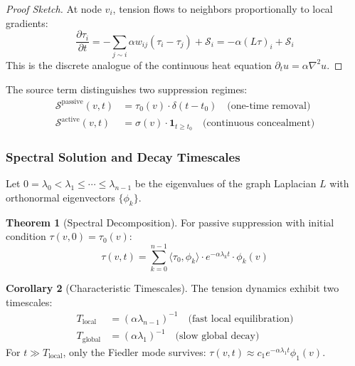 \documentclass[11pt,a4paper]{article}
\theoremstyle{definition}
\newtheorem{theorem}{Theorem}[section]
\newtheorem{corollary}[theorem]{Corollary}
\theoremstyle{remark}
\begin{document}
\begin{proof}[Proof Sketch]
At node $v_i$, tension flows to neighbors proportionally to local gradients:
\begin{equation}
    \frac{\partial \tau_i}{\partial t} = -\sum_{j \sim i} \alpha w_{ij}(\tau_i - \tau_j) + \mathcal{S}_i = -\alpha (L\tau)_i + \mathcal{S}_i
\end{equation}
This is the discrete analogue of the continuous heat equation $\partial_t u = \alpha \nabla^2 u$.
\end{proof}

The source term distinguishes two suppression regimes:
\begin{align}
    \mathcal{S}^{\text{passive}}(v, t) &= \tau_0(v) \cdot \delta(t - t_0) \quad \text{(one-time removal)} \\
    \mathcal{S}^{\text{active}}(v, t) &= \sigma(v) \cdot \mathbf{1}_{t \geq t_0} \quad \text{(continuous concealment)}
\end{align}

\subsubsection{Spectral Solution and Decay Timescales}

Let $0 = \lambda_0 < \lambda_1 \leq \cdots \leq \lambda_{n-1}$ be the eigenvalues of the graph Laplacian $L$ with orthonormal eigenvectors $\{\phi_k\}$.

\begin{theorem}[Spectral Decomposition]
\label{thm:spectral}
For passive suppression with initial condition $\tau(v, 0) = \tau_0(v)$:
\begin{equation}
    \boxed{
    \tau(v, t) = \sum_{k=0}^{n-1} \langle \tau_0, \phi_k \rangle \cdot e^{-\alpha \lambda_k t} \cdot \phi_k(v)
    }
\end{equation}
\end{theorem}

\begin{corollary}[Characteristic Timescales]
The tension dynamics exhibit two timescales:
\begin{align}
    T_{\text{local}} &= (\alpha \lambda_{n-1})^{-1} \quad \text{(fast local equilibration)} \\
    T_{\text{global}} &= (\alpha \lambda_1)^{-1} \quad \text{(slow global decay)}
\end{align}
For $t \gg T_{\text{local}}$, only the Fiedler mode survives: $\tau(v, t) \approx c_1 e^{-\alpha \lambda_1 t} \phi_1(v)$.
\end{corollary}
\end{document}
